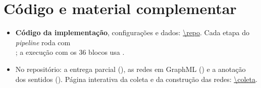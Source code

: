 \section*{Código e material complementar}\label{sec:material}

\begin{itemize}
    \item \textbf{Código da implementação}, configurações e dados: \url{\repo}. Cada etapa do
    \emph{pipeline} roda com\\ ; a execução com os 36 blocos usa .
    \item No repositório: a entrega parcial (), as redes em
    GraphML () e a anotação dos sentidos (). Página
    interativa da coleta e da construção das redes: \url{\coleta}.
\end{itemize}
